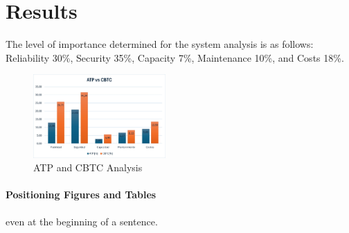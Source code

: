 \documentclass[conference]{IEEEtran}
\begin{document}
\section{Results}
The level of importance determined for the system analysis is as follows: Reliability 30\%, Security 35\%, Capacity 7\%, Maintenance 10\%, and Costs 18\%.
\begin{figure}[ht]
    \centering
    \includegraphics[width=0.45\textwidth, scale=1]{Imagenes_general/ATP VS CBTC.jpg}
    \caption{ ATP and CBTC Analysis}
    \label{fig:Analysis}
\end{figure}




\paragraph{Positioning Figures and Tables} 
even at the beginning of a sentence.





\end{document}
